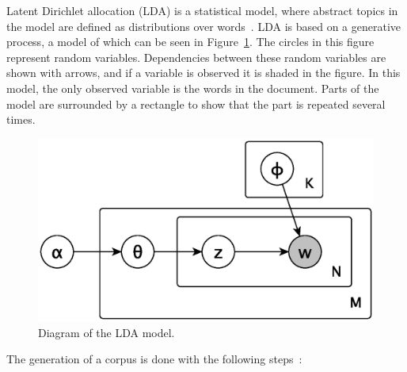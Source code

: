 Latent Dirichlet allocation (LDA) is a statistical model, where abstract topics in the model are defined as distributions over words~\cite{blei2003latent}.
LDA is based on a generative process, a model of which can be seen in Figure~\ref{fig:lda_gen_process}.
The circles in this figure represent random variables.
Dependencies between these random variables are shown with arrows, and if a variable is observed it is shaded in the figure.
In this model, the only observed variable is the words in the document.
Parts of the model are surrounded by a rectangle to show that the part is repeated several times.

\begin{figure}[!ht]
\includegraphics[scale=0.7]{figures/lda-generative-process.eps}
\caption{Diagram of the LDA model.}\label{fig:lda_gen_process}
\end{figure}

The generation of a corpus is done with the following steps~\cite{crain2012dimensionality, blei2003latent}:

